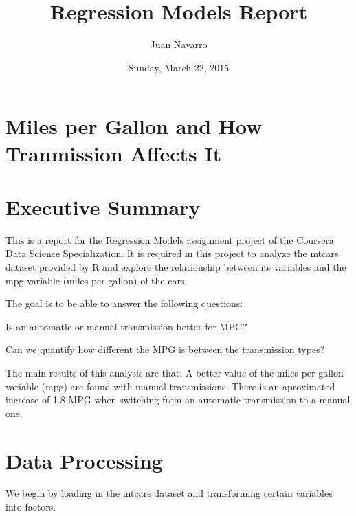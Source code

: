 \documentclass[]{article}
\title{Regression Models Report}
\author{Juan Navarro}
\date{Sunday, March 22, 2015}
\newenvironment{Shaded}{\begin{snugshade}}{\end{snugshade}}
\newcommand{\KeywordTok}[1]{\textcolor[rgb]{0.13,0.29,0.53}{\textbf{{#1}}}}
\newcommand{\DataTypeTok}[1]{\textcolor[rgb]{0.13,0.29,0.53}{{#1}}}
\newcommand{\StringTok}[1]{\textcolor[rgb]{0.31,0.60,0.02}{{#1}}}
\newcommand{\NormalTok}[1]{{#1}}
\begin{document}
\maketitle


\section{Miles per Gallon and How Tranmission Affects
It}\label{miles-per-gallon-and-how-tranmission-affects-it}

\section{Executive Summary}\label{executive-summary}

This is a report for the Regression Models assignment project of the
Coursera Data Science Specialization. It is required in this project to
analyze the mtcars dataset provided by R and explore the relationship
between its variables and the mpg variable (miles per gallon) of the
cars.

The goal is to be able to answer the following questions:

Is an automatic or manual transmission better for MPG?

Can we quantify how different the MPG is between the transmission types?

The main results of this analysis are that: A better value of the miles
per gallon variable (mpg) are found with manual transmissions. There is
an aproximated increase of 1.8 MPG when switching from an automatic
transmission to a manual one.

\section{Data Processing}\label{data-processing}

We begin by loading in the mtcars dataset and transforming certain
variables into factors.

\begin{Shaded}
\end{Shaded}
\end{document}

